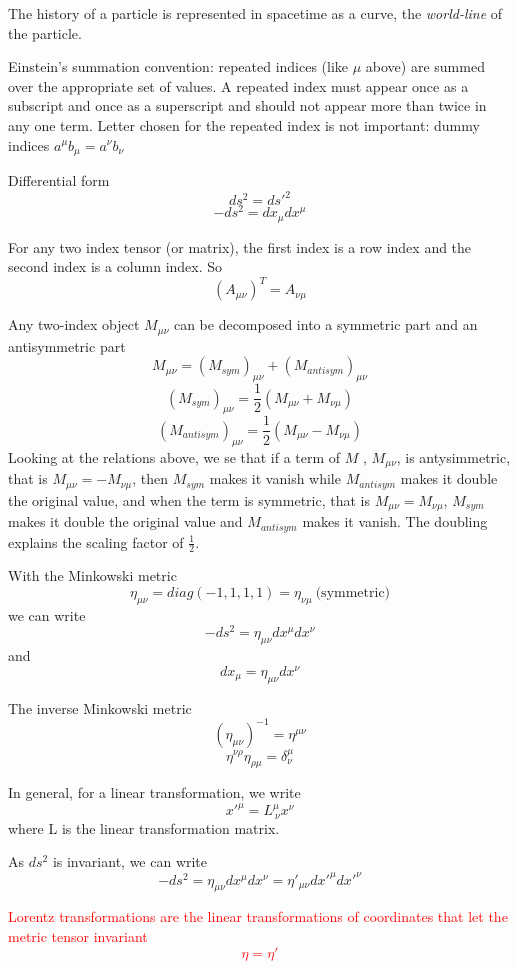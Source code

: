 \documentclass[12pt]{report}
\begin{document}
\begin{itemize}
    \item The history of a particle is represented in spacetime as a curve, the \textit{world-line} of the particle.
    \item Einstein's summation convention: repeated indices (like $\mu$ above) are summed over the appropriate set of values. A repeated index must appear once as a subscript and once as a superscript and should not appear more than twice in any one term. Letter chosen for the repeated index is not important: dummy indices $ a^\mu b_\mu = a^\nu b_\nu$
    \item Differential form $$ds^2=ds'^2$$ $$-ds^2=dx_\mu dx^\mu$$
    \item For any two index tensor (or matrix), the first index is a row index and the second index is a column index. So $$(A_{\mu \nu})^T=A_{\nu \mu}$$
    \item Any two-index object $M_{\mu \nu}$ can be decomposed into a symmetric part and an antisymmetric part $$M_{\mu \nu} = (M_{sym})_{\mu \nu} + (M_{antisym})_{\mu \nu}$$ $$(M_{sym})_{\mu \nu} = \frac{1}{2}(M_{\mu \nu} + M_{\nu \mu})$$ $$(M_{antisym})_{\mu \nu} = \frac{1}{2} (M_{\mu \nu} - M_{\nu \mu})$$
    Looking at the relations above, we se that if a term of $M$ , $M_{\mu \nu}$, is antysimmetric, that is $M_{\mu \nu} = -M_{\nu \mu}$, then $M_{sym}$ makes it vanish while $M_{antisym}$ makes it double the original value, and when the term is symmetric, that is $M_{\mu \nu} = M_{\nu \mu}$, $M_{sym}$ makes it double the original value and $M_{antisym}$ makes it vanish. The doubling explains the scaling factor of $\frac{1}{2}$.
    \item With the Minkowski metric $$\eta _{\mu \nu} = diag(-1, 1, 1, 1) = \eta_{\nu \mu}\  \textrm{(symmetric)}$$
    we can write $$-ds^2 = \eta_{\mu \nu}dx^\mu dx^\nu$$
    and $$dx_\mu = \eta_{\mu \nu}dx^\nu$$
    \item The inverse Minkowski metric $$(\eta_{\mu \nu})^{-1} = \eta^{\mu \nu} $$ $$\eta^{\nu \rho} \eta_ {\rho \mu} = \delta _\nu ^\mu$$
    \item In general, for a linear transformation, we write  $$x'^\mu = L^\mu _{\ \nu} x^\nu$$ where L is the linear transformation matrix.  
    \item As $ds^2$ is invariant, we can write $$-ds^2 = \eta _{\mu \nu} dx^{\mu} dx^{\nu} = \eta '_{\mu \nu} dx'^\mu dx'^\nu$$
    \textcolor{red}{\item Lorentz transformations are the linear transformations of coordinates that let the metric tensor invariant $$\eta = \eta '$$ 
}
\end{itemize}
\end{document}
